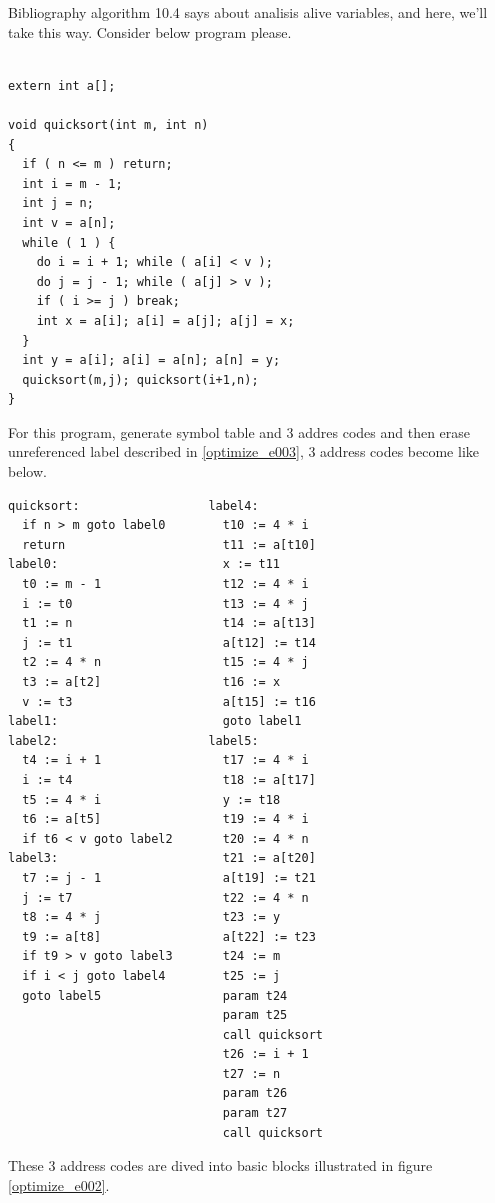 Bibliography \cite{doragon} algorithm 10.4 says about 
analisis alive variables, and here, we'll take this way.
Consider below program please.
\begin{verbatim}

extern int a[];

void quicksort(int m, int n)
{
  if ( n <= m ) return;
  int i = m - 1;
  int j = n;
  int v = a[n];
  while ( 1 ) {
    do i = i + 1; while ( a[i] < v );
    do j = j - 1; while ( a[j] > v );
    if ( i >= j ) break;
    int x = a[i]; a[i] = a[j]; a[j] = x;
  }
  int y = a[i]; a[i] = a[n]; a[n] = y;
  quicksort(m,j); quicksort(i+1,n);
}
\end{verbatim}
For this program, generate symbol table and 3 addres codes
and then erase unreferenced label described in \ref{optimize_e003},
3 address codes become like below.
\begin{verbatim}
quicksort:                  label4:
  if n > m goto label0        t10 := 4 * i
  return                      t11 := a[t10]
label0:                       x := t11
  t0 := m - 1                 t12 := 4 * i
  i := t0                     t13 := 4 * j
  t1 := n                     t14 := a[t13]
  j := t1                     a[t12] := t14
  t2 := 4 * n                 t15 := 4 * j
  t3 := a[t2]                 t16 := x
  v := t3                     a[t15] := t16
label1:                       goto label1
label2:                     label5:
  t4 := i + 1                 t17 := 4 * i
  i := t4                     t18 := a[t17]
  t5 := 4 * i                 y := t18
  t6 := a[t5]                 t19 := 4 * i
  if t6 < v goto label2       t20 := 4 * n
label3:                       t21 := a[t20]
  t7 := j - 1                 a[t19] := t21
  j := t7                     t22 := 4 * n
  t8 := 4 * j                 t23 := y
  t9 := a[t8]                 a[t22] := t23
  if t9 > v goto label3       t24 := m
  if i < j goto label4        t25 := j
  goto label5                 param t24
                              param t25
                              call quicksort
                              t26 := i + 1
                              t27 := n
                              param t26
                              param t27
                              call quicksort
\end{verbatim}
These 3 address codes are dived into basic blocks illustrated in
figure \ref{optimize_e002}.
